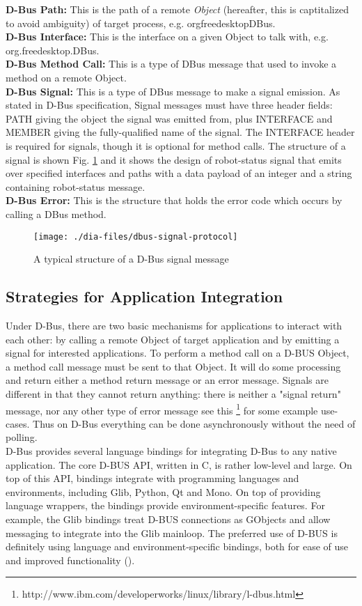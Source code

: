 \textbf{D-Bus Path: }
This is the path of a remote \textit{Object} (hereafter, this is captitalized to avoid ambiguity) of target process, e.g. \/org\/freedesktop\/DBus.\\
\textbf{D-Bus Interface: }
This is the interface on a given Object to talk with, e.g. org.freedesktop.DBus.\\
\textbf{D-Bus Method Call: }
This is a type of DBus message that used to invoke a method on a remote Object.\\
\textbf{D-Bus Signal: }
This is a type of DBus message to make a signal emission. As stated in D-Bus specification, Signal messages must have three header fields: PATH giving the object the signal was emitted from, plus INTERFACE and MEMBER giving the fully-qualified name of the signal. The INTERFACE header is required for signals, though it is optional for method calls. The structure of a signal is shown Fig. \ref{fig:dbus-signal-protocol} and it shows the design of robot-status signal that emits over specified interfaces and paths with a data payload of an integer and a string containing robot-status message.\\
\textbf{D-Bus Error: }
This is the structure that holds the error code which occurs by calling a DBus method.
\begin{figure}
\begin{center}
\texttt{[image: ./dia-files/dbus-signal-protocol]} %
\caption{A typical structure of a D-Bus signal message} 
\label{fig:dbus-signal-protocol}
\end{center}
\end{figure}
\subsection*{Strategies for Application Integration}
Under D-Bus, there are two basic mechanisms for applications to interact with each other: by calling a remote Object of target application and by emitting a signal for interested applications. To perform a method call on a D-BUS Object, a method call message must be sent to that Object. It will do some processing and return either a method return message or an error message. Signals are different in that they cannot return anything: there is neither a "signal return" message, nor any other type of error message see this \footnote{http://www.ibm.com/developerworks/linux/library/l-dbus.html} for some example use-cases. Thus on D-Bus everything can be done asynchronously without the need of polling.\\ 
D-Bus provides several language bindings for integrating D-Bus to any native application. The core D-BUS API, written in C, is rather low-level and large. On top of this API, bindings integrate with programming languages and environments, including Glib, Python, Qt and Mono. On top of providing language wrappers, the bindings provide environment-specific features. For example, the Glib bindings treat D-BUS connections as GObjects and allow messaging to integrate into the Glib mainloop. The preferred use of D-BUS is definitely using language and environment-specific bindings, both for ease of use and improved functionality (\cite{Love2005}).
